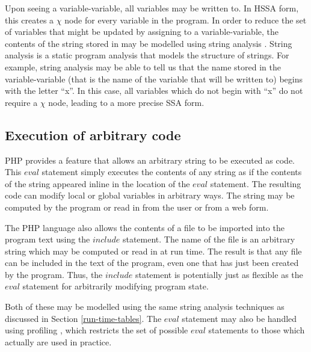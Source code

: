 Upon seeing a variable-variable, all variables may be written to.  In
HSSA form, this creates a $\chi$ node for every variable in the
program.  In order to reduce the set of variables that might be
updated by assigning to a variable-variable, the contents of the
string stored in  may be modelled using string analysis
\cite{Wassermann2007}.  String analysis is a static program analysis
that models the structure of strings.  For example, string analysis
may be able to tell us that the name stored in the variable-variable
(that is the name of the variable that will be written to) begins with
the letter ``x''.  In this case, all variables which do not begin with
``x'' do not require a $\chi$ node, leading to a more precise SSA form.

\subsection{Execution of arbitrary code}
PHP provides a feature that allows an arbitrary string to be executed
as code. This $\textit{eval}$ statement simply executes the contents of any
string as if the contents of the string appeared inline in the
location of the $\textit{eval}$ statement. The resulting code can modify local
or global variables in arbitrary ways. The string may be computed by
the program or read in from the user or from a web form.

The PHP language also allows the contents of a file to be imported
into the program text using the $\textit{include}$ statement. The name of the
file is an arbitrary string which may be computed or read in at run
time. The result is that any file can be included in the text of the
program, even one that has just been created by the program.  Thus,
the $\textit{include}$ statement is potentially just as flexible as the
$\textit{eval}$ statement for arbitrarily modifying program state.

Both of these may be modelled using the same string analysis
techniques \cite{Wassermann2007} as discussed in Section
\ref{run-time-tables}.  The $\textit{eval}$ statement may also be handled
using profiling \cite{Furr2009}, which restricts the set of possible
$\textit{eval}$ statements to those which actually are used in practice.

